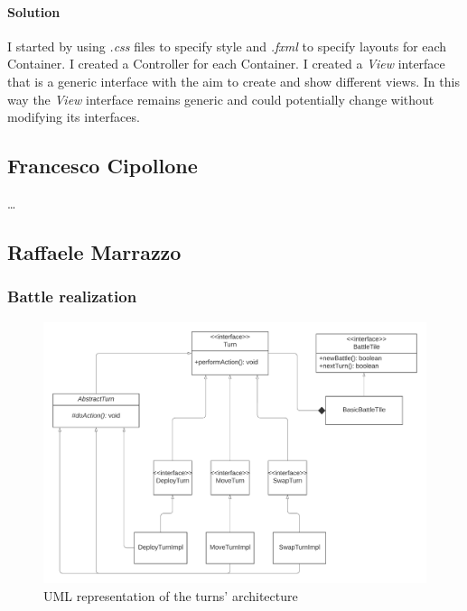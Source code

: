 \documentclass[12pt, a4paper]{report}
\begin{document}
            \paragraph{Solution}

            I started by using \textit{.css} files to specify style and \textit{.fxml} to specify layouts for each Container.
            I created a Controller for each Container.
            I created a \textit{View} interface that is a generic interface with the aim to create and show different views.
            In this way the \textit{View} interface remains generic and could potentially change without modifying its interfaces.

    \subsection*{Francesco Cipollone}

    \dots

    \subsection*{Raffaele Marrazzo}

        \subsubsection{Battle realization}
            
        \begin{figure}[H]
            \centering{}
            \caption{UML representation of the turns' architecture}
            \includegraphics[width=\textwidth]{turns}
        \end{figure}
\end{document}
